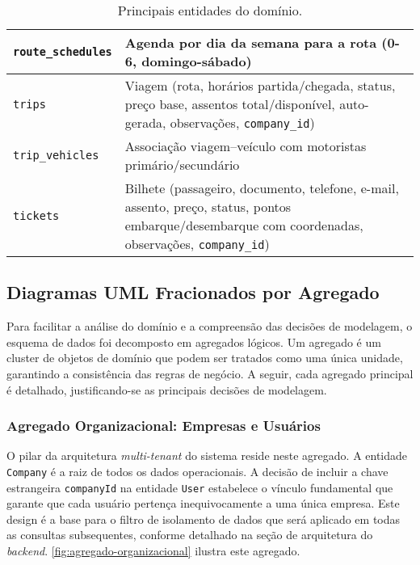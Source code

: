 \begin{table}[H]
\begin{tabular}{|p{3.5cm}|p{11.5cm}|}
    \hline
    \texttt{route\_schedules} & Agenda por dia da semana para a rota (0-6, domingo-sábado)                                                                                                                                     \\
    \hline
    \texttt{trips}            & Viagem (rota, horários partida/chegada, status, preço base, assentos total/disponível, auto-gerada, observações, \texttt{company\_id})                                                         \\
    \hline
    \texttt{trip\_vehicles}   & Associação viagem--veículo com motoristas primário/secundário                                                                                                                                  \\
    \hline
    \texttt{tickets}          & Bilhete (passageiro, documento, telefone, e-mail, assento, preço, status, pontos embarque/desembarque com coordenadas, observações, \texttt{company\_id})                                      \\
    \hline
  \end{tabular}
  \caption{Principais entidades do domínio.}
  \label{tab:principais-entidades}
\end{table}

\subsection{Diagramas UML Fracionados por Agregado}

Para facilitar a análise do domínio e a compreensão das decisões de modelagem, o esquema de dados foi decomposto em agregados lógicos. Um agregado é um cluster de objetos de domínio que podem ser tratados como uma única unidade, garantindo a consistência das regras de negócio. A seguir, cada agregado principal é detalhado, justificando-se as principais decisões de modelagem.

\subsubsection*{Agregado Organizacional: Empresas e Usuários}

O pilar da arquitetura \textit{multi-tenant} do sistema reside neste agregado. A entidade \texttt{Company} é a raiz de todos os dados operacionais. A decisão de incluir a chave estrangeira \texttt{companyId} na entidade \texttt{User} estabelece o vínculo fundamental que garante que cada usuário pertença inequivocamente a uma única empresa. Este design é a base para o filtro de isolamento de dados que será aplicado em todas as consultas subsequentes, conforme detalhado na seção de arquitetura do \textit{backend}. \autoref{fig:agregado-organizacional} ilustra este agregado.

